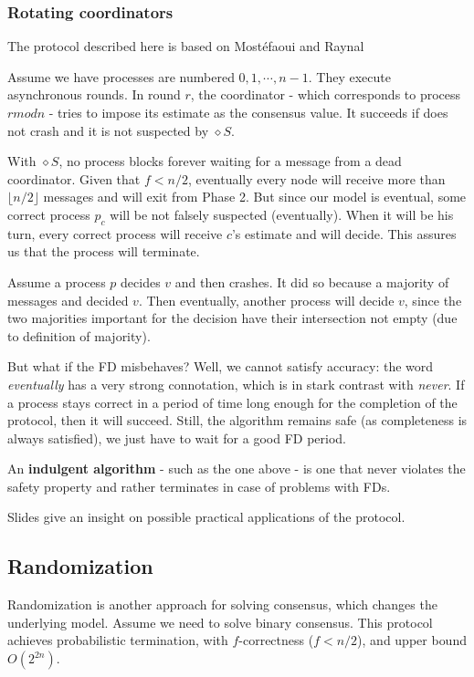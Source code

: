 \documentclass[a4paper,11pt,hidelinks]{article}
\begin{document}
\subsubsection{Rotating coordinators}

The protocol described here is based on Most{\'e}faoui and Raynal \cite{10.1007/3-540-48169-9_4}

Assume we have processes are numbered $0, 1, \cdots, n - 1$. They execute asynchronous rounds. In round $r$, the coordinator - which corresponds to process $r mod n$ - tries to impose its estimate as the consensus value. It succeeds if does not crash and it is not suspected by $\diamond S$.

With $\diamond S$, no process blocks forever waiting for a message from a dead coordinator. Given that $f < n/2$, eventually every node will receive more than $\lfloor n / 2 \rfloor$ messages and will exit from Phase 2. But since our model is eventual, some correct process $p_c$ will be not falsely suspected (eventually). When it will be his turn, every correct process will receive $c$'s estimate and will decide. This assures us that the process will terminate.

Assume a process $p$ decides $v$ and then crashes. It did so because a majority of messages and decided $v$. Then eventually, another process will decide $v$, since the two majorities important for the decision have their intersection not empty (due to definition of majority).

But what if the FD misbehaves? Well, we cannot satisfy accuracy: the word \textit{eventually} has a very strong connotation, which is in stark contrast with \textit{never}. If a process stays correct in a period of time long enough for the completion of the protocol, then it will succeed. Still, the algorithm remains safe (as completeness is always satisfied), we just have to wait for a good FD period.

An \textbf{indulgent algorithm} - such as the one above - is one that never violates the safety property and rather terminates in case of problems with FDs.

Slides give an insight on possible practical applications of the protocol.

\subsection{Randomization}

Randomization is another approach for solving consensus, which changes the underlying model. Assume we need to solve binary consensus. This protocol achieves probabilistic termination, with $f$-correctness ($f < n/2$), and upper bound $O(2^{2n})$.
\end{document}
